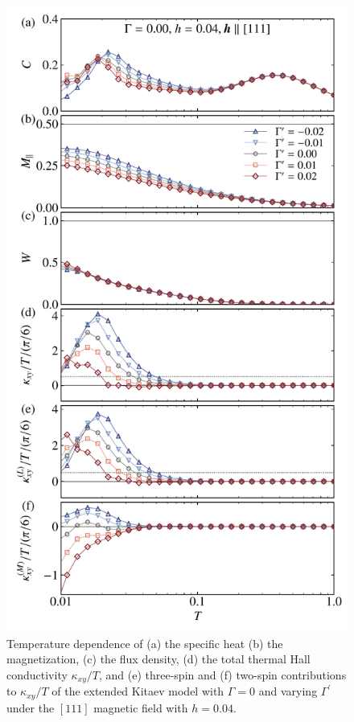 \documentclass[twocolumn,superscriptaddress,showpacs, longbibliography, aps, prx]{revtex4-2}
\begin{document}
\begin{figure}[tbh]
  \begin{center}
    \includegraphics[width=\linewidth]{Data_for_figs/plot/fig-09-XTRG-gammap_dep-004.pdf}
  \end{center}
  \caption{Temperature dependence of (a) the specific heat (b) the magnetization, (c) the flux density, 
   (d) the total thermal Hall conductivity $\kappa_{xy}/T$, and
   (e) three-spin and (f) two-spin contributions to $\kappa_{xy}/T$ of the extended Kitaev model with $\Gamma=0$ and varying $\Gamma^{\prime}$ under the $[111]$ magnetic field with $h=0.04$.
  }
  \label{fig:all_h0.04_Gp}
\end{figure}
\end{document}
